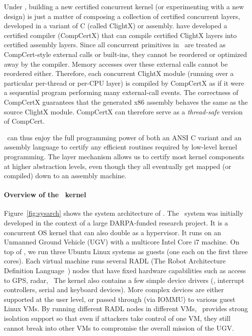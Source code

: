 Under \CTOS, building a new certified concurrent kernel (or
experimenting with a new design) is just a matter of composing a
collection of certified concurrent layers, developed in a variant of C
(called ClightX) or assembly.  \citet{dscal15} have
developed a certified compiler (CompCertX) that can compile certified
ClightX layers into certified assembly layers. Since all
concurrent primitives in \CTOS\ are treated as CompCert-style
external calls or built-ins,
they cannot be reordered or optimized away by the compiler. Memory
accesses over these external calls cannot be reordered either.
Therefore, each concurrent ClightX module (running over a particular
per-thread or per-CPU layer) is compiled by CompCertX as if it were a
sequential program performing many external-call events. The
correctness of CompCertX guarantees that the generated x86 assembly
behaves the same as the source ClightX module.  CompCertX can
therefore serve as a {\em thread-safe} version of CompCert.

\CTOS\ can thus enjoy the full programming power of both an ANSI C
variant and an assembly language to certify any efficient routines
required by low-level kernel programming.  The layer mechanism allows
us to certify most kernel components at higher abstraction levels,
even though they all eventually get mapped (or compiled) down to an
assembly machine.

\vspace*{-10pt}
\paragraph{Overview of the \mCTOS\ kernel}
Figure~\ref{fig:sysarch} shows the system architecture of \mCTOS.  The
\mCTOS\ system was initially developed in the context of a large
DARPA-funded research project.  It is a concurrent OS kernel that can
also double as a hypervisor.  It runs on an Unmanned Ground Vehicle
(UGV) with a multicore Intel Core i7 machine.  On top of
\mCTOS, we run three Ubuntu Linux systems as guests (one each
on the first three cores). Each virtual machine runs several RADL (The
Robot Architecture Definition Language~\cite{radl15}) nodes that have
fixed hardware capabilities such as access to GPS, radar, \etc\  
The kernel also contains a few simple device drivers (\eg, interrupt
controllers, serial and keyboard devices). More complex devices are
either supported at the user level, or passed through (via IOMMU) to
various guest Linux VMs. By running different RADL nodes in different
VMs, \mCTOS\ provides strong isolation support so that even if
attackers take control of one VM, they still cannot break into other
VMs to compromise the overall mission of the UGV.

